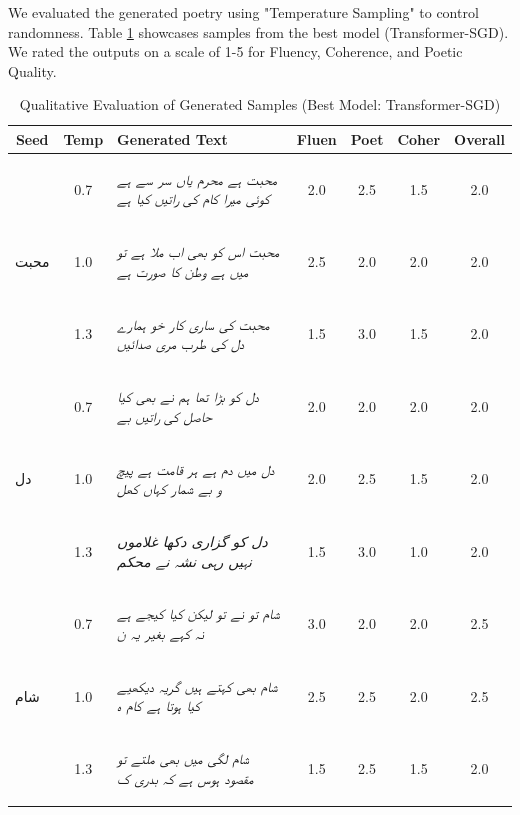 \documentclass[12pt,a4paper]{article}
\newcommand{\ur}[1]{{\begin{urdu}\textit{#1}\end{urdu}}}
\newcommand{\thead}[1]{\multicolumn{1}{c}{\textbf{#1}}}
\begin{document}
We evaluated the generated poetry using "Temperature Sampling" to control randomness. Table \ref{tab:generation} showcases samples from the best model (Transformer-SGD). We rated the outputs on a scale of 1-5 for Fluency, Coherence, and Poetic Quality.

\begin{table}[ht!]
    \centering
    \caption{Qualitative Evaluation of Generated Samples (Best Model: Transformer-SGD)}
    \label{tab:generation}
    \footnotesize
    \begin{tabularx}{\textwidth}{l c X c c c c}
        \toprule
        \thead{Seed} & \thead{Temp} & \textbf{Generated Text} & \thead{Fluen} & \thead{Poet} & \thead{Coher} & \thead{Overall} \\ 
        \midrule
        
        \multirow{3}{*}{محبت} 
        & 0.7 & \ur{\textit{محبت ہے محرم یاں سر سے ہے کوئی میرا کام کی راتیں کیا ہے}} & 2.0 & 2.5 & 1.5 & 2.0 \\ 
        
        & 1.0 & \ur{\textit{محبت اس کو بھی اب ملا ہے تو میں ہے وطن کا صورت ہے}} & 2.5 & 2.0 & 2.0 & 2.0 \\
        
        & 1.3 & \ur{\textit{محبت کی ساری کار خو ہمارے دل کی طرب مری صدائیں}} & 1.5 & 3.0 & 1.5 & 2.0 \\
        
        \midrule
        
        \multirow{3}{*}{دل} 
        & 0.7 & \ur{\textit{دل کو بڑا تھا ہم نے بھی کیا حاصل کی راتیں بے}} & 2.0 & 2.0 & 2.0 & 2.0 \\ 
        
        & 1.0 & \ur{\textit{دل میں دم ہے ہر قامت ہے پیچ و بے شمار کہاں کھل}} & 2.0 & 2.5 & 1.5 & 2.0 \\
        
        & 1.3 & \ur{\textit{دل کو گزاری دکھا غلاموں نہیں رہی نشہ نے محکم}} & 1.5 & 3.0 & 1.0 & 2.0 \\
        
        \midrule
        
        \multirow{3}{*}{شام} 
        & 0.7 & \ur{\textit{شام تو نے تو لیکن کیا کیجے ہے نہ کہے بغیر یہ ن}} & 3.0 & 2.0 & 2.0 & 2.5 \\ 
        
        & 1.0 & \ur{\textit{شام بھی کہتے ہیں گریہ دیکھیے کیا ہوتا ہے کام ہ}} & 2.5 & 2.5 & 2.0 & 2.5 \\
        
        & 1.3 & \ur{\textit{شام لگی میں بھی ملتے تو مقصود ہوس ہے کہ بدری ک}} & 1.5 & 2.5 & 1.5 & 2.0 \\

        \bottomrule
    \end{tabularx}
\end{table}
\end{document}
